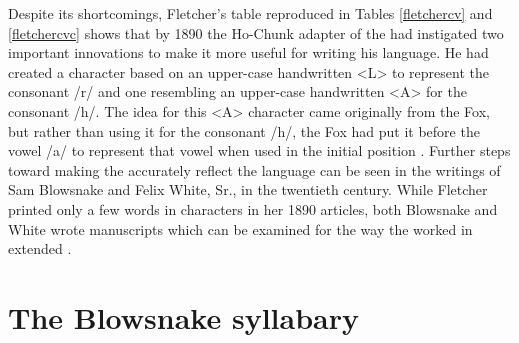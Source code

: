 \documentclass[output=paper]{LSP/langsci}
\begin{document}
Despite its shortcomings, Fletcher's table reproduced in Tables \ref{fletchercv} and \ref{fletchercvc} shows that by 1890 the Ho-Chunk adapter of the   had instigated two important innovations to make it more useful for writing his language. He had created a character based on an upper-case handwritten <L> to represent the  consonant /r/ and one resembling an upper-case handwritten <A> for the consonant /h/. The idea for this <A> character came originally from the Fox, but rather than using it for the consonant /h/, the Fox had put it before the vowel /a/ to represent that vowel when used in the initial position \citep[170]{Walker1996}. Further steps toward making the   accurately reflect the language can be seen in the writings of Sam Blowsnake and Felix White, Sr., in the twentieth century. While Fletcher printed only a few words in  characters in her 1890 articles, both Blowsnake and White wrote manuscripts which can be examined for the way the  worked in extended . 

\section{The Blowsnake syllabary}
\end{document}
